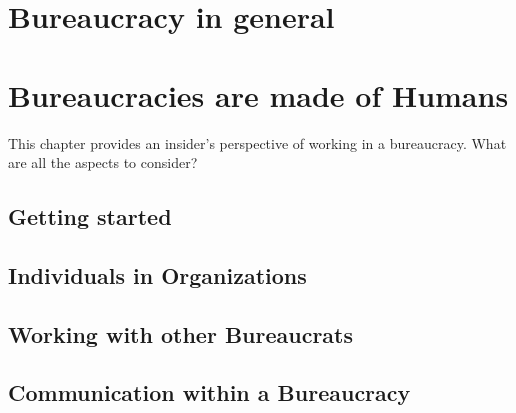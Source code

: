 \documentclass{book}
\begin{document}
\chapter{Bureaucracy in general}
  
  
  
  
  
  


\chapter{Bureaucracies are made of Humans\label{b_made_of_humans}}

This chapter provides an insider's perspective of working in a bureaucracy. What are all the aspects to consider?

  \section{Getting started}
    
    
    
    
  \section{Individuals in Organizations}
    
    
    
    
    
  \section{Working with other Bureaucrats}
    
    
    
    
  
    
    
    
  \section{Communication within a Bureaucracy}
    
    
    
\end{document}
